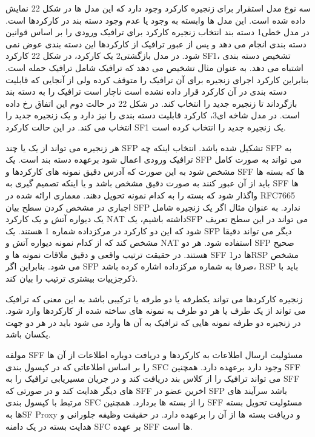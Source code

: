 \documentclass{book}
\begin{document}
سه نوع مدل استقرار برای زنجیره کارکرد وجود دارد که این مدل ها در شکل 22 نمایش داده شده است. این مدل ها وابسته به وجود یا عدم وجود دسته بند در کارکردها است. در مدل خطی1 دسته بند انتخاب زنجیره کارکرد برای ترافیک ورودی را بر اساس قوانین دسته بندی انجام می دهد و پس از عبور ترافیک از کارکردها این دسته بندی عوض نمی شود. در مدل بازگشتی2 یک کارکرد، در شکل 22 کارکرد SF1، تشخیص دسته بندی اشتباه می دهد. به عنوان مثال تشخیص می دهد که ترافیک شامل ترافیک حمله است. بنابراین کارکرد اجرای زنجیره برای آن ترافیک را متوقف کرده ولی از آنجایی که قابلیت دسته بندی در آن کارکرد قرار داده نشده است ناچار است ترافیک را به دسته بند بازگرداند تا زنجیره جدید را انتخاب کند. در شکل 22 در حالت دوم این اتفاق رخ داده است. در مدل شاخه ای3، کارکرد قابلیت دسته بندی را نیز دارد و یک زنجیره جدید را انتخاب می کند. در این حالت کارکرد SF1 یک زنجیره جدید را انتخاب کرده است.

هر زنجیره می تواند از یک یا چند SFP تشکیل شده باشد. انتخاب اینکه چه SFP به ترافیک ورودی اعمال شود برعهده دسته بند است. یک SFP می تواند به صورت کامل مشخص شود به این صورت که آدرس دقیق نمونه های کارکردها و SFF ها که بسته ها باید از آن عبور کنند به صورت دقیق مشخص باشد و یا اینکه تصمیم گیری به SFF ها واگذار شود که بسته را به کدام نمونه تحویل دهند. معماری ارائه شده در RFC7665 اجباری در مشخص کردن سطح بیان SFP ندارد. به عنوان مثال اگر یک زنجیره شامل یک دیواره آتش و یک کارکرد NAT داشته باشیم، یکSFP  می تواند در این سطح تعریف شود که این دو کارکرد در مرکزداده شماره 1 هستند. یک SFP دیگر می تواند دقیقا مشخص کند که از کدام نمونه دیواره آتش و NAT استفاده شود. هر دو SFP صحیح هستند. در حقیقت ترتیب واقعی و دقیق ملاقات نمونه ها و SFF ها در1RSP مشخص می شود. بنابراین اگر SFP صرفا به شماره مرکزداده اشاره کرده باشد، RSP باید با ذکرجزییات بیشتری ترتیب را بیان کند.

زنجیره کارکردها می تواند یکطرفه یا دو طرفه یا ترکیبی باشد به این معنی که ترافیک می تواند از یک طرف یا هر دو طرف به نمونه های ساخته شده از کارکردها وارد شود. در زنجیره دو طرفه نمونه هایی که ترافیک به آن ها وارد می شود باید در هر دو جهت یکسان باشد.


مولفه SFF مسئولیت ارسال اطلاعات به کارکردها و دریافت دوباره اطلاعات از آن ها را بر اساس اطلاعاتی که در کپسول بندی SFC وجود دارد برعهده دارد. همچنین SFF می تواند ترافیک را از کلاس بند دریافت کند و در جریان مسیریابی ترافیک را به SFF های دیگر هدایت کند و در صورتی که SFF اخرین عضو در SFP باشد سرآیند های مرتبط با کپسول بندی SFC را از بسته ها بردارد. همچنین SFF مسئولیت تحویل بسته ها بهSF Proxy و دریافت بسته ها از آن را برعهده دارد. در حقیقت وظیفه جلورانی و هدایت بسته در یک دامنه SFC بر عهده SFF ها است.
\end{document}
